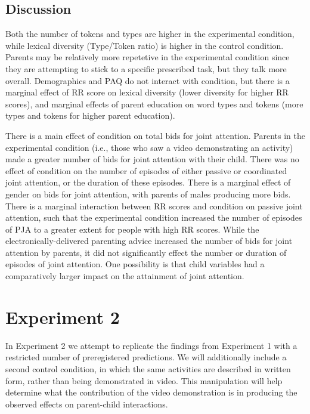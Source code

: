 \documentclass[10pt, letterpaper]{article}
\begin{document}
\subsection{Discussion}\label{discussion}

Both the number of tokens and types are higher in the experimental
condition, while lexical diversity (Type/Token ratio) is higher in the
control condition. Parents may be relatively more repetetive in the
experimental condition since they are attempting to stick to a specific
prescribed task, but they talk more overall. Demographics and PAQ do not
interact with condition, but there is a marginal effect of RR score on
lexical diversity (lower diversity for higher RR scores), and marginal
effects of parent education on word types and tokens (more types and
tokens for higher parent education).

There is a main effect of condition on total bids for joint attention.
Parents in the experimental condition (i.e., those who saw a video
demonstrating an activity) made a greater number of bids for joint
attention with their child. There was no effect of condition on the
number of episodes of either passive or coordinated joint attention, or
the duration of these episodes. There is a marginal effect of gender on
bids for joint attention, with parents of males producing more bids.
There is a marginal interaction between RR scores and condition on
passive joint attention, such that the experimental condition increased
the number of episodes of PJA to a greater extent for people with high
RR scores. While the electronically-delivered parenting advice increased
the number of bids for joint attention by parents, it did not
significantly effect the number or duration of episodes of joint
attention. One possibility is that child variables had a comparatively
larger impact on the attainment of joint attention.

\section{Experiment 2}\label{experiment-2}

In Experiment 2 we attempt to replicate the findings from Experiment 1
with a restricted number of preregistered predictions. We will
additionally include a second control condition, in which the same
activities are described in written form, rather than being demonstrated
in video. This manipulation will help determine what the contribution of
the video demonstration is in producing the observed effects on
parent-child interactions.
\end{document}
